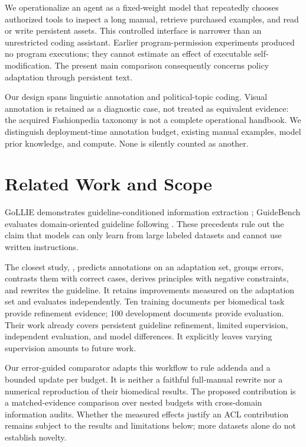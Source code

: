 \documentclass[11pt]{article}
\begin{document}
We operationalize an agent as a fixed-weight model that repeatedly chooses authorized tools to inspect a long manual, retrieve purchased examples, and read or write persistent assets. This controlled interface is narrower than an unrestricted coding assistant. Earlier program-permission experiments produced no program executions; they cannot estimate an effect of executable self-modification. The present main comparison consequently concerns policy adaptation through persistent text.

Our design spans linguistic annotation and political-topic coding. Visual annotation is retained as a diagnostic case, not treated as equivalent evidence: the acquired Fashionpedia taxonomy is not a complete operational handbook. We distinguish deployment-time annotation budget, existing manual examples, model prior knowledge, and compute. None is silently counted as another.

\section{Related Work and Scope}
GoLLIE demonstrates guideline-conditioned information extraction \citep{gollie}; GuideBench evaluates domain-oriented guideline following \citep{guidebench}. These precedents rule out the claim that models can only learn from large labeled datasets and cannot use written instructions.

The closest study, \citet{kim2026refining}, predicts annotations on an adaptation set, groups errors, contrasts them with correct cases, derives principles with negative constraints, and rewrites the guideline. It retains improvements measured on the adaptation set and evaluates independently. Ten training documents per biomedical task provide refinement evidence; 100 development documents provide evaluation. Their work already covers persistent guideline refinement, limited supervision, independent evaluation, and model differences. It explicitly leaves varying supervision amounts to future work.

Our error-guided comparator adapts this workflow to rule addenda and a bounded update per budget. It is neither a faithful full-manual rewrite nor a numerical reproduction of their biomedical results. The proposed contribution is a matched-evidence comparison over nested budgets with cross-domain information audits. Whether the measured effects justify an ACL contribution remains subject to the results and limitations below; more datasets alone do not establish novelty.
\end{document}
